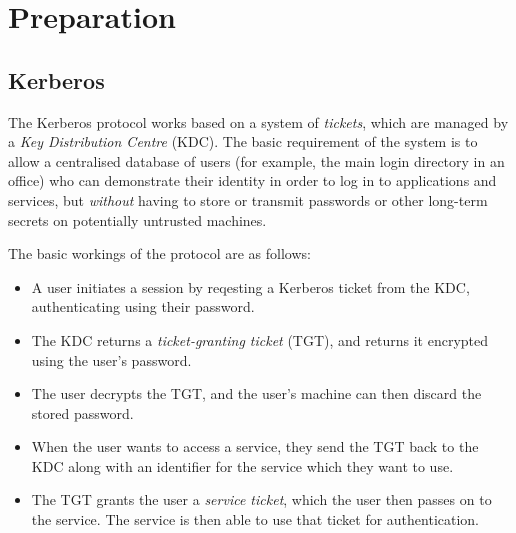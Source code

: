 \documentclass{article}
\begin{document}



\section{Preparation}

\subsection{Kerberos}
The Kerberos protocol works based on a system of \textit{tickets}, which are managed by a \textit{Key Distribution Centre} (KDC). The basic requirement of the system is to allow a centralised database of users (for example, the main login directory in an office) who can demonstrate their identity in order to log in to applications and services, but \textit{without} having to store or transmit passwords or other long-term secrets on potentially untrusted machines.

The basic workings of the protocol are as follows:

\begin{itemize}
\item
  A user initiates a session by reqesting a Kerberos ticket from the KDC, authenticating using their password.
\item
  The KDC returns a \textit{ticket-granting ticket} (TGT), and returns it encrypted using the user's password.
\item
  The user decrypts the TGT, and the user's machine can then discard the stored password.
\item
  When the user wants to access a service, they send the TGT back to the KDC along with an identifier for the service which they want to use.
\item
  The TGT grants the user a \textit{service ticket}, which the user then passes on to the service. The service is then able to use that ticket for authentication.
\end{itemize}
\end{document}
